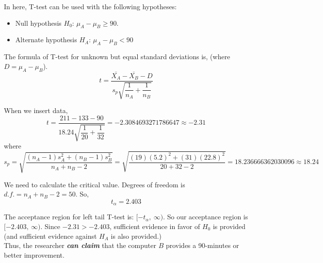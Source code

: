 In here, T-test can be used with the following hypotheses:
\begin{itemize}[leftmargin=.6cm]
  \item Null hypothesis $H_0$: $\mu_A - \mu_B \geq 90$.
  \item Alternate hypothesis $H_A$: $\mu_A - \mu_B < 90$
\end{itemize}

\noindent The formula of T-test for unknown but equal standard deviations is, (where $D = \mu_A - \mu_B$).
\begin{equation*}
  t = \frac{\bar{X_A} - \bar{X_B} - D}{s_p \sqrt{\dfrac{1}{n_A} + \dfrac{1}{n_B}}}
\end{equation*}

\noindent When we insert data,
\begin{equation*}
  t = \frac{211 - 133 - 90}{18.24 \sqrt{\dfrac{1}{20} + \dfrac{1}{32}}} = -2.3084693271786647 \approx -2.31
\end{equation*}
where
\begin{equation*}
  s_p = \sqrt{\frac{(n_A-1)s_A^2 + (n_B-1)s_B^2}{n_A + n_B - 2}} = \sqrt{\frac{(19)(5.2)^2 + (31)(22.8)^2}{20 + 32 - 2}} = 18.236666362030096 \approx 18.24
\end{equation*}

\noindent We need to calculate the critical value. Degrees of freedom is $d.f. = n_A + n_B - 2 = 50$. So,
\begin{equation*}
  t_{\alpha} = 2.403
\end{equation*}

\noindent The acceptance region for left tail T-test is: $[-t_{\alpha},\ \infty)$. So our acceptance region is $[-2.403,\ \infty)$. Since $-2.31 > -2.403$, sufficient evidence in favor of $H_0$ is provided (and sufficient evidence against $H_A$ is also provided.)\\

Thus, the researcher \textit{\textbf{can claim}} that the computer $B$ provides a 90-minutes or better improvement.

